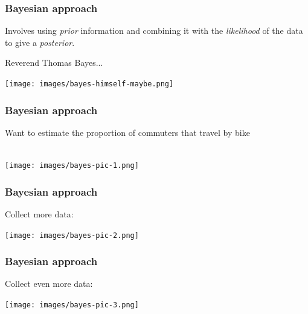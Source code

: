 
\begin{frame}
\frametitle{Bayesian approach}

Involves using \emph{prior} information and combining it with the
\emph{likelihood} of the data to give a \emph{posterior}.

Reverend Thomas Bayes...

\texttt{[image: images/bayes-himself-maybe.png]}


\end{frame}







\begin{frame}
\frametitle{Bayesian approach}

Want to estimate the proportion of commuters that travel by bike

~\\

\texttt{[image: images/bayes-pic-1.png]}

\end{frame}


\begin{frame}
\frametitle{Bayesian approach}

Collect more data:

\texttt{[image: images/bayes-pic-2.png]}

\end{frame}


\begin{frame}
\frametitle{Bayesian approach}

Collect even more data:

\texttt{[image: images/bayes-pic-3.png]}

\end{frame}

